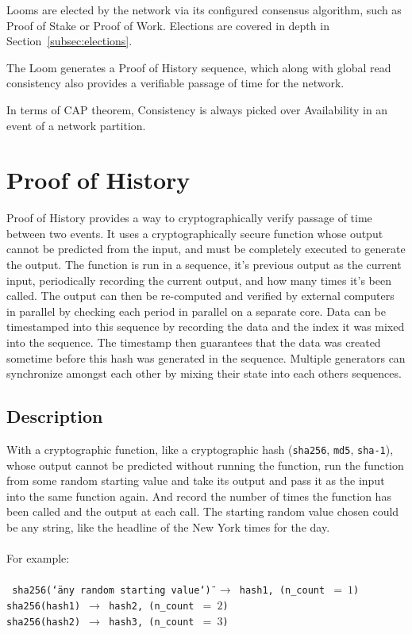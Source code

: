 \documentclass[12pt]{article}
\begin{document}
Looms are elected by the network via its configured consensus algorithm, such as Proof of Stake or Proof of Work. Elections are covered in depth in Section~\ref{subsec:elections}.

The Loom generates a Proof of History sequence, which along with global read consistency also provides a verifiable passage of time for the network.

In terms of CAP theorem, Consistency is always picked over Availability in an event of a network partition.

\section{Proof of History}\label{proof_of_history}

Proof of History provides a way to cryptographically verify passage of time between two events. It uses a cryptographically secure function whose output cannot be predicted from the input, and must be completely executed to generate the output. The function is run in a sequence, it’s previous output as the current input, periodically recording the current output, and how many times it’s been called. The output can then be re-computed and verified by external computers in parallel by checking each period in parallel on a separate core. Data can be timestamped into this sequence by recording the data and the index it was mixed into the sequence. The timestamp then guarantees that the data was created sometime before this hash was generated in the sequence. Multiple generators can synchronize amongst each other by mixing their state into each others sequences. \\

\subsection{Description}
With a cryptographic function, like a cryptographic hash (\texttt{sha256}, \texttt{md5}, \texttt{sha-1}), whose output cannot be predicted without running the function, run the function from some random starting value and take its output and pass it as the input into the same function again. And record the number of times the function has been called and the output at each call. The starting random value chosen could be any string, like the headline of the New York times for the day.
\\\\
\noindent For example: \\\\\noindent
\texttt{
  sha256(\char`\"any random starting value\char`\") $\rightarrow$
  hash1, (n\_count~$=~1$) \\
  sha256(hash1) $\rightarrow$ hash2, (n\_count~$=~2$)\\
  sha256(hash2) $\rightarrow$ hash3, (n\_count~$=~3$)\\
}
\end{document}

